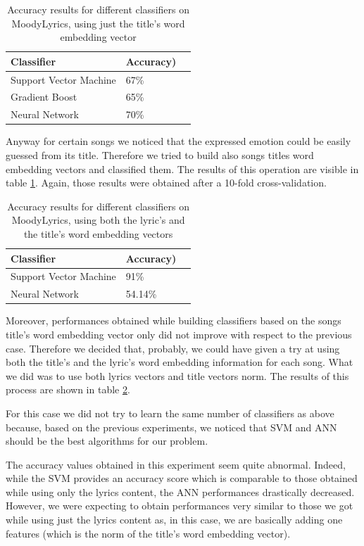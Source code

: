 \begin{table}[]
\centering
\begin{tabular}{@{}lll@{}}
\toprule
\textbf{Classifier} & \textbf{Accuracy})   \\ \midrule
Support Vector Machine & 67\%  \\
Gradient Boost & 65\%  \\
Neural Network & 70\%  \\
\end{tabular}
\caption{Accuracy results for different classifiers on MoodyLyrics, using just the title's word embedding vector}
\label{table:ml-simple-results-title}
\end{table}

Anyway for certain songs we noticed that the expressed emotion could be easily guessed from its title. Therefore
we tried to build also songs titles word embedding vectors and classified them. The results of this operation are 
visible in table \ref{table:ml-simple-results-title}. Again, those results were obtained after a 10-fold cross-validation. 

\begin{table}[]
\centering
\begin{tabular}{@{}lll@{}}
\toprule
\textbf{Classifier} & \textbf{Accuracy})   \\ \midrule
Support Vector Machine & 91\%  \\
Neural Network & 54.14\%  \\
\end{tabular}
\caption{Accuracy results for different classifiers on MoodyLyrics, using both the lyric's and the title's word embedding vectors}
\label{table:ml-simple-results-both}
\end{table}

Moreover, performances obtained while building classifiers based on the songs title's word embedding vector only
did not improve with respect to the previous case. Therefore we decided
that, probably, we could have given a try at using both the title's and the lyric's word embedding information for each
song. What we did was to use both lyrics vectors and title vectors norm. The results of this process are shown in table \ref{table:ml-simple-results-both}.

For this case we did not try to learn the same number of classifiers as above because, based on the previous experiments, we noticed
that SVM and ANN should be the best algorithms for our problem. 

The accuracy values obtained in this experiment seem quite abnormal. Indeed,
while the SVM provides an accuracy score which is comparable to those obtained while using only the lyrics content, the ANN performances 
drastically decreased. However, we were expecting to obtain performances very similar to those we got while using just the lyrics content as, 
in  this case, we are basically adding one features (which is the norm of the title's word embedding vector).

